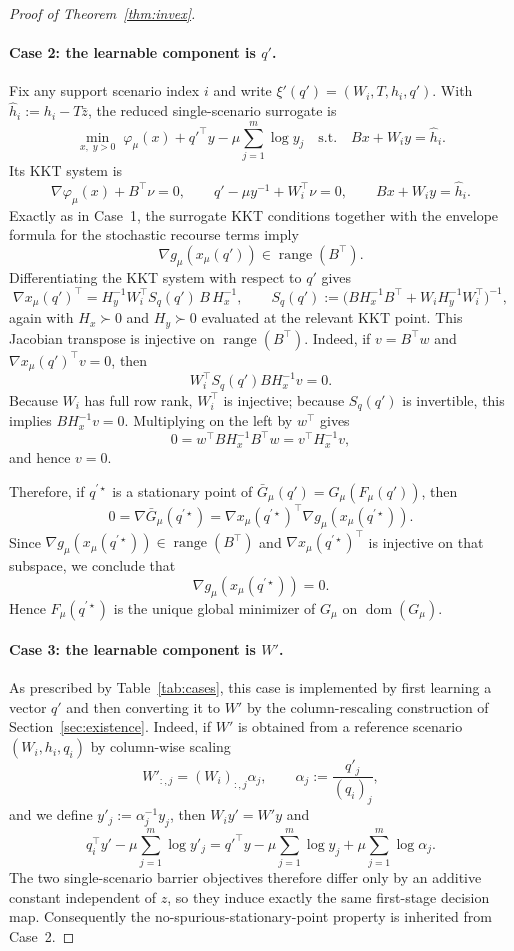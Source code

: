 \documentclass{article}
\theoremstyle{plain}
\theoremstyle{definition}
\theoremstyle{remark}
\begin{document}
\begin{proof}[Proof of Theorem~\ref{thm:invex}]
\paragraph{Case 2: the learnable component is \(q'\).}
Fix any support scenario index \(i\) and write \(\xi'(q')=(W_i,T,h_i,q')\).
With \(\hat h_i:=h_i-T\bar z\), the reduced single-scenario surrogate is
\[
\min_{x,\;y>0}\;
\varphi_\mu(x)+{q'}^\top y-\mu\sum_{j=1}^{m}\log y_j
\quad\text{s.t.}\quad
Bx+W_i y=\hat h_i.
\]
Its KKT system is
\[
\nabla \varphi_\mu(x)+B^\top \nu=0,
\qquad
q'-\mu y^{-1}+W_i^\top \nu=0,
\qquad
Bx+W_i y=\hat h_i.
\]
Exactly as in Case~1, the surrogate KKT conditions together with the envelope formula for the stochastic recourse terms imply
\[
\nabla g_\mu(x_\mu(q'))\in \operatorname{range}(B^\top).
\]
Differentiating the KKT system with respect to \(q'\) gives
\[
\nabla x_\mu(q')^\top
=
H_y^{-1}W_i^\top S_q(q')\,B\,H_x^{-1},
\qquad
S_q(q'):=\big(BH_x^{-1}B^\top+W_iH_y^{-1}W_i^\top\big)^{-1},
\]
again with \(H_x\succ 0\) and \(H_y\succ 0\) evaluated at the relevant KKT point.
This Jacobian transpose is injective on \(\operatorname{range}(B^\top)\). Indeed, if \(v=B^\top w\) and \(\nabla x_\mu(q')^\top v=0\), then
\[
W_i^\top S_q(q') B H_x^{-1} v = 0.
\]
Because \(W_i\) has full row rank, \(W_i^\top\) is injective; because \(S_q(q')\) is invertible, this implies \(B H_x^{-1} v=0\). Multiplying on the left by \(w^\top\) gives
\[
0=w^\top B H_x^{-1} B^\top w = v^\top H_x^{-1} v,
\]
and hence \(v=0\).

Therefore, if \(q^{\prime\star}\) is a stationary point of \(\bar G_\mu(q')=G_\mu(F_\mu(q'))\), then
\[
0=\nabla \bar G_\mu(q^{\prime\star})
=\nabla x_\mu(q^{\prime\star})^\top \nabla g_\mu(x_\mu(q^{\prime\star})).
\]
Since \(\nabla g_\mu(x_\mu(q^{\prime\star}))\in \operatorname{range}(B^\top)\) and \(\nabla x_\mu(q^{\prime\star})^\top\) is injective on that subspace, we conclude that
\[
\nabla g_\mu(x_\mu(q^{\prime\star}))=0.
\]
Hence \(F_\mu(q^{\prime\star})\) is the unique global minimizer of \(G_\mu\) on \(\operatorname{dom}(G_\mu)\).

\paragraph{Case 3: the learnable component is \(W'\).}
As prescribed by Table~\ref{tab:cases}, this case is implemented by first learning a vector \(q'\) and then converting it to \(W'\) by the column-rescaling construction of Section~\ref{sec:existence}.
Indeed, if \(W'\) is obtained from a reference scenario \((W_i,h_i,q_i)\) by column-wise scaling
\[
W'_{:,j}=(W_i)_{:,j}\alpha_j,
\qquad
\alpha_j:=\frac{q'_j}{(q_i)_j},
\]
and we define \(y'_j:=\alpha_j^{-1}y_j\), then \(W_i y'=W' y\) and
\[
q_i^\top y' - \mu\sum_{j=1}^m \log y'_j
=
{q'}^\top y - \mu\sum_{j=1}^m \log y_j
+\mu\sum_{j=1}^m \log \alpha_j.
\]
The two single-scenario barrier objectives therefore differ only by an additive constant independent of \(z\), so they induce exactly the same first-stage decision map. Consequently the no-spurious-stationary-point property is inherited from Case~2.


\end{proof}
\end{document}
